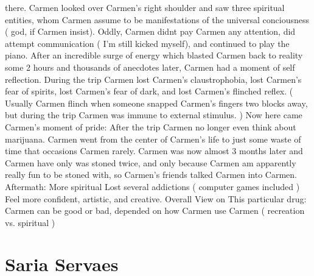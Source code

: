 \documentclass[12pt]{book}
\begin{document}
there. Carmen looked over Carmen's right shoulder and saw three spiritual entities, whom Carmen assume to be manifestations of the universal conciousness ( god, if Carmen insist). Oddly, Carmen didnt pay Carmen any attention, did attempt communication ( I'm still kicked myself), and continued to play the piano. After an incredible surge of energy which blasted Carmen back to reality some 2 hours and thousands of anecdotes later, Carmen had a moment of self reflection. During the trip Carmen lost Carmen's claustrophobia, lost Carmen's fear of spirits, lost Carmen's fear of dark, and lost Carmen's flinched reflex. ( Usually Carmen flinch when someone snapped Carmen's fingers two blocks away, but during the trip Carmen was immune to external stimulus. ) Now here came Carmen's moment of pride: After the trip Carmen no longer even think about marijuana. Carmen went from the center of Carmen's life to just some waste of time that occasions Carmen rarely. Carmen was now almost 3 months later and Carmen have only was stoned twice, and only because Carmen am apparently really fun to be stoned with, so Carmen's friends talked Carmen into Carmen. Aftermath: More spiritual Lost several addictions ( computer games included ) Feel more confident, artistic, and creative. Overall View on This particular drug: Carmen can be good or bad, depended on how Carmen use Carmen ( recreation vs. spiritual )



\chapter{Saria Servaes}
\end{document}
